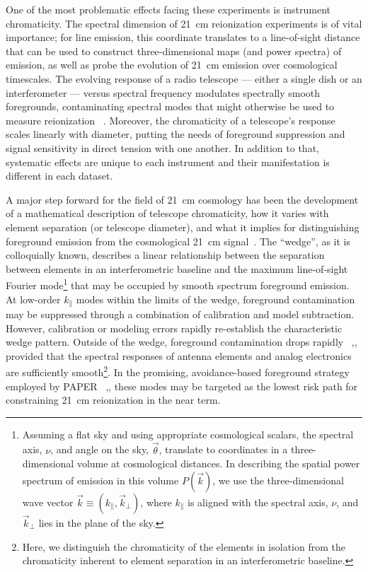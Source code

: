 \documentclass[twocolumn]{emulateapj}
\begin{document}
One of the most problematic effects facing these experiments is instrument
chromaticity.  The spectral dimension of 21~cm reionization experiments is of vital
importance; for line emission, this coordinate translates to a line-of-sight distance
that can be used to construct three-dimensional maps (and power spectra) of emission,
as well as probe the evolution of 21~cm emission over cosmological timescales.
The evolving response of a radio telescope --- either a single dish
or an interferometer --- versus spectral frequency modulates spectrally smooth foregrounds,
contaminating spectral modes that might
otherwise be used to measure reionization ~\citep{liu_et_al2014a}.  Moreover, the chromaticity of
a telescope's response scales linearly with diameter, putting the
needs of foreground suppression and signal sensitivity in direct tension with one
another. In addition to that, systematic effects are unique to each instrument and their manifestation 
is different in each dataset.

A major step forward for the field of 21~cm cosmology has been the development
of a mathematical description of telescope chromaticity, how it varies with
element separation (or telescope diameter), and what it implies for distinguishing
foreground emission from the cosmological 21~cm signal~\citep{Thyagarajan_et_al2015}.  The ``wedge'', as it is
colloquially known, describes a linear relationship between the separation between elements
in an interferometric baseline and the maximum line-of-sight Fourier mode\footnote{Assuming
a flat sky and using appropriate
cosmological scalars,
the spectral axis, $\nu$, and angle on the sky, $\vec\theta$, translate to coordinates in
a three-dimensional volume at cosmological distances.  In describing the spatial power spectrum of
emission in this volume $P(\vec k)$, we use the three-dimensional wave vector 
$\vec k\equiv(k_\parallel,\vec k_\perp)$, where $k_\parallel$ is aligned with the
spectral axis, $\nu$, and $\vec k_\perp$ lies in the plane of the sky.}
that may be occupied by smooth spectrum foreground emission.  At low-order $k_\parallel$ modes
within the limits of the wedge,
foreground contamination may be suppressed through a combination of calibration and model 
subtraction.  However, calibration or modeling errors rapidly re-establish the characteristic
wedge pattern.  Outside of the wedge, foreground contamination drops rapidly 
~\citep{pober_et_al2013},\citep{Thyagarajan_et_al2015}, provided that the spectral responses
of antenna elements and analog electronics are sufficiently smooth\footnote{Here, we distinguish
the chromaticity of the elements in isolation from the chromaticity inherent to
element separation in an interferometric baseline.}.  In the promising, avoidance-based
foreground strategy employed by PAPER ~\citep{parsons_et_al2014},\citep{Ali_et_al2015}, these modes
may be targeted as the lowest risk path for constraining 21~cm reionization in the near term.
  
\end{document}
